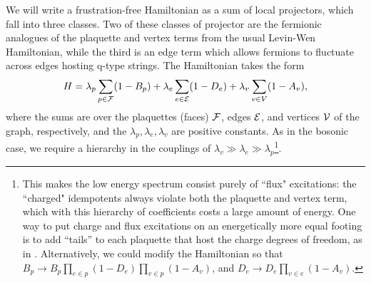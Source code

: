 We will write a frustration-free Hamiltonian as a sum of local projectors, which fall into
three classes.
Two of these classes of projector are the fermionic analogues of the plaquette and vertex terms from the usual Levin-Wen Hamiltonian, 
while the third is an edge term which allows fermions to fluctuate across edges hosting q-type strings.
The Hamiltonian takes the form
\begin{align} \label{ham}
H = \lambda_p \sum_{p \in \mathcal{F}} (1-B_p) + \lambda_e \sum_{e \in \mathcal{E}} (1-D_e) + \lambda_v \sum_{v \in V} (1-A_v),
\end{align}
where the sums are over the plaquettes (faces) $\mathcal{F}$, edges $\mathcal{E}$, and vertices $\mathcal{V}$ of the graph, 
respectively, and the $\lambda_p,\lambda_e,\lambda_v$ are positive constants.
As in the bosonic case, we require a hierarchy in the couplings of $\lambda_v \gg \lambda_e \gg \lambda_p$\footnote{This makes the low energy spectrum consist purely of ``flux" excitations: 
the ``charged" idempotents always violate both the plaquette and vertex term, which with this hierarchy of coefficients costs a large amount of energy. 
One way to put charge and flux excitations on an energetically more equal footing is to add ``tails'' to each 
plaquette that host the charge degrees of freedom, as in \cite{Hu2015}.
Alternatively, we could modify the Hamiltonian so that $B_p \rightarrow B_p \prod_{e \in p} (1-D_e) \prod_{v \in p} (1-A_v)$, and $D_e \rightarrow D_e \prod_{v \in e} (1-A_v)$.
}.
